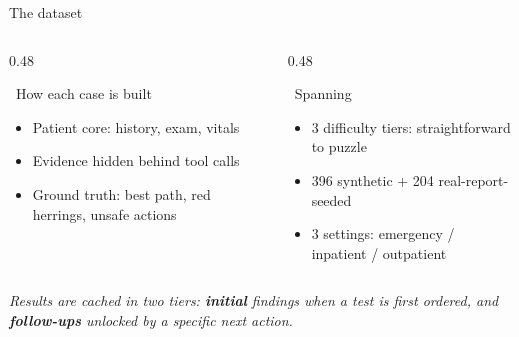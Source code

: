 \documentclass[aspectratio=169,t]{beamer}
\begin{document}
\begin{frame}{The dataset}
  \vspace{1mm}
  \begin{columns}[T,onlytextwidth]
    \begin{column}{0.48\textwidth}
      \begin{block}{\faSitemap\;\, How each case is built}
        \footnotesize
        \begin{itemize}\setlength\itemsep{0.2em}
          \item Patient core: history, exam, vitals
          \item Evidence hidden behind tool calls
          \item Ground truth: best path, red herrings, unsafe actions
        \end{itemize}
      \end{block}
    \end{column}%
    \hfill
    \begin{column}{0.48\textwidth}
      \begin{alertblock}{\faThLarge\;\, Spanning}
        \footnotesize
        \begin{itemize}\setlength\itemsep{0.2em}
          \item 3 difficulty tiers: straightforward to puzzle
          \item 396 synthetic + 204 real-report-seeded
          \item 3 settings: emergency / inpatient / outpatient
        \end{itemize}
      \end{alertblock}
    \end{column}
  \end{columns}

  \vspace{1mm}
  \centering\scriptsize\itshape\color{CERNtextdark}
  Results are cached in two tiers: \textbf{initial} findings when a test is
  first ordered, and \textbf{follow-ups} unlocked by a specific next action.
\end{frame}
\end{document}
